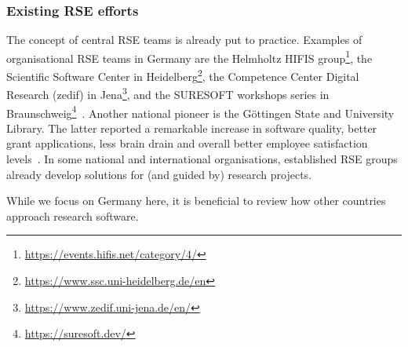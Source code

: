 \documentclass[a4paper]{article}
\makeatletter
\newcommand*{\eg}{e.\,g.\@\xspace}
\makeatother
\begin{document}
\subsubsection{Existing RSE efforts}
The concept of central RSE teams is already put to practice.
Examples  of organisational RSE teams in Germany are
 the Helmholtz HIFIS group\footnote{\url{https://events.hifis.net/category/4/}}\autocite{haupt_hifis_consulting_2021},
 the Scientific Software Center in Heidelberg\footnote{\url{https://www.ssc.uni-heidelberg.de/en}}\autocite{ulusoy_heidelberg_ssc_2024},
 the Competence Center Digital Research (zedif) in Jena\footnote{\url{https://www.zedif.uni-jena.de/en/}},
 and the SURESOFT workshops series in Braunschweig\footnote{\url{https://suresoft.dev/}}~\autocite{Blech2022}.
Another national pioneer is the Göttingen State and University Library.
The latter reported a remarkable increase in software quality, better grant applications, less brain drain and overall better employee satisfaction levels~\autocite{schimavoigt2023}.
In some national and international organisations, established RSE groups already develop solutions for (and guided by) research projects.

While we focus on Germany here, it is beneficial to review how other countries approach research software.

\end{document}
